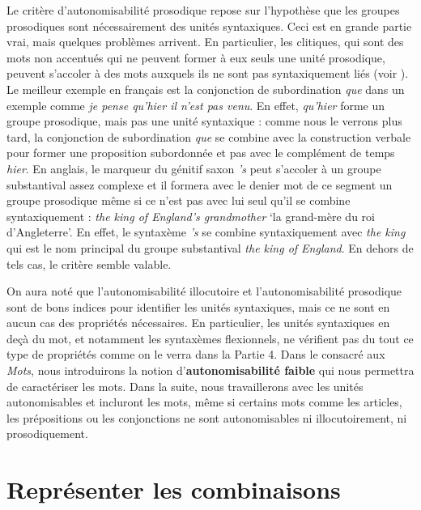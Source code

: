 Le critère d’autonomisabilité prosodique repose sur l’hypothèse que les groupes prosodiques sont nécessairement des unités syntaxiques. Ceci est en grande partie vrai, mais quelques problèmes arrivent. En particulier, les clitiques, qui sont des mots non accentués qui ne peuvent former à eux seuls une unité prosodique, peuvent s’accoler à des mots auxquels ils ne sont pas syntaxiquement liés (voir ). Le meilleur exemple en français est la conjonction de subordination \textit{que} dans un exemple comme \textit{je pense {\textbar} qu’hier {\textbar} il n’est pas venu}. En effet, \textit{qu’hier} forme un groupe prosodique, mais pas une unité syntaxique : comme nous le verrons plus tard, la conjonction de subordination \textit{que} se combine avec la construction verbale pour former une proposition subordonnée et pas avec le complément de temps \textit{hier}. En anglais, le marqueur du génitif saxon \textit{’s} peut s’accoler à un groupe substantival assez complexe et il formera avec le denier mot de ce segment un groupe prosodique même si ce n’est pas avec lui seul qu’il se combine syntaxiquement : \textit{the king {\textbar} of England’s {\textbar} grandmother} ‘la grand-mère du roi d’Angleterre’. En effet, le syntaxème \textit{’s} se combine syntaxiquement avec \textit{the king} qui est le nom principal du groupe substantival \textit{the king of England}. En dehors de tels cas, le critère semble valable.

On aura noté que l’autonomisabilité illocutoire et l’autonomisabilité prosodique sont de bons indices pour identifier les unités syntaxiques, mais ce ne sont en aucun cas des propriétés nécessaires. En particulier, les unités syntaxiques en deçà du mot, et notamment les syntaxèmes flexionnels, ne vérifient pas du tout ce type de propriétés comme on le verra dans la Partie 4. Dans le  consacré aux \textit{Mots}, nous introduirons la notion d’\textbf{autonomisabilité faible} qui nous permettra de caractériser les mots. Dans la suite, nous travaillerons avec les unités autonomisables et incluront les mots, même si certains mots comme les articles, les prépositions ou les conjonctions ne sont autonomisables ni illocutoirement, ni prosodiquement.

\section{Représenter les combinaisons}\label{sec:3.2.12}

